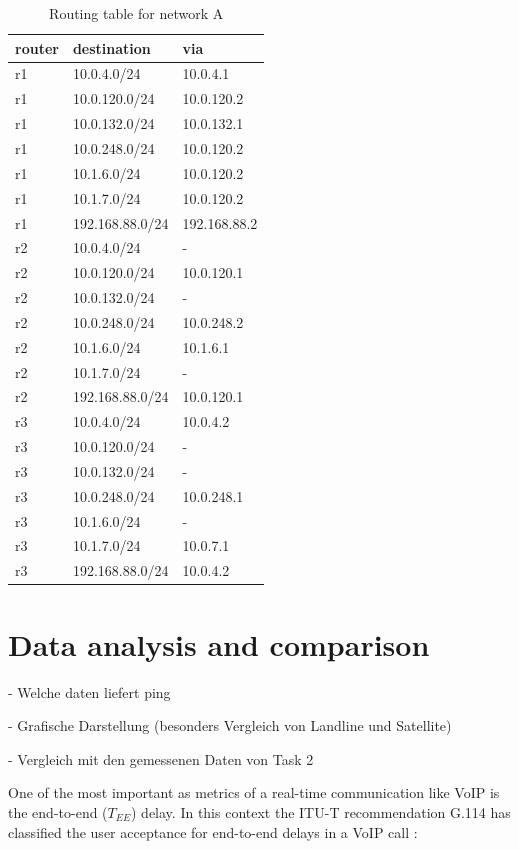 \documentclass[parskip=full]{scrartcl}
\begin{document}
\begin{table}[hb]
	\centering

	\begin{tabular}{lll}
		\toprule
		\textbf{router} & \textbf{destination} & \textbf{via}  \\ \midrule
		r1 & 10.0.4.0/24 & 10.0.4.1 \\
		r1 & 10.0.120.0/24 & 10.0.120.2 \\
		r1 & 10.0.132.0/24 & 10.0.132.1 \\
		r1 & 10.0.248.0/24 & 10.0.120.2 \\
		r1 & 10.1.6.0/24 & 10.0.120.2 \\
		r1 & 10.1.7.0/24 & 10.0.120.2 \\
		r1 & 192.168.88.0/24 & 192.168.88.2\\
		\midrule
		r2 & 10.0.4.0/24 & - \\
		r2 & 10.0.120.0/24 & 10.0.120.1 \\
		r2 & 10.0.132.0/24 & - \\
		r2 & 10.0.248.0/24 & 10.0.248.2 \\
		r2 & 10.1.6.0/24 & 10.1.6.1 \\
		r2 & 10.1.7.0/24 & - \\
		r2 & 192.168.88.0/24 & 10.0.120.1\\
		\midrule
		r3 & 10.0.4.0/24 & 10.0.4.2 \\
		r3 & 10.0.120.0/24 & - \\
		r3 & 10.0.132.0/24 & - \\
		r3 & 10.0.248.0/24 & 10.0.248.1 \\
		r3 & 10.1.6.0/24 & - \\
		r3 & 10.1.7.0/24 & 10.0.7.1 \\
		r3 & 192.168.88.0/24 & 10.0.4.2\\
		\bottomrule
	\end{tabular}
	\caption{Routing table for network A}
	\label{tab:routing}
\end{table}
\clearpage
\section{Data analysis and comparison} \label{sec:data}
- Welche daten liefert ping

- Grafische Darstellung (besonders Vergleich von Landline und Satellite)

- Vergleich mit den gemessenen Daten von Task 2

One of the most important as metrics of a real-time communication like VoIP is the end-to-end ($T_{EE}$) delay. In this context the ITU-T recommendation G.114 has classified the user acceptance for end-to-end delays in a VoIP call \cite{ITU-TRecommendationG.114}:
\end{document}
